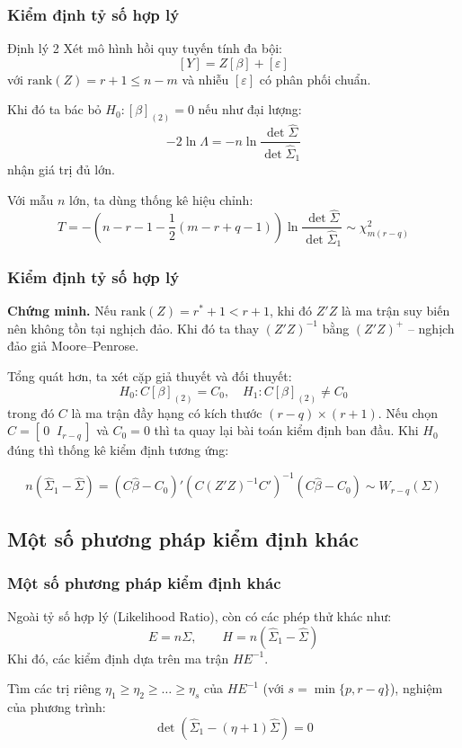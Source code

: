 \begin{frame}
\frametitle{Kiểm định tỷ số hợp lý}
\begin{block}{Định lý 2}
Xét mô hình hồi quy tuyến tính đa bội:
\[
[Y] = Z[\beta] + [\varepsilon]
\]
với $\mathrm{rank}(Z) = r + 1 \le n - m$ và nhiễu $[\varepsilon]$ có phân phối chuẩn.

Khi đó ta bác bỏ $H_0: [\beta]_{(2)} = 0$ nếu như đại lượng:
\[
-2\ln\Lambda = -n\ln\frac{\det \widehat{\Sigma}}{\det \widehat{\Sigma}_1}
\]
nhận giá trị đủ lớn.

Với mẫu $n$ lớn, ta dùng thống kê hiệu chỉnh:
\[
T = -\left(n - r - 1 - \frac{1}{2}(m - r + q - 1)\right)
\ln\frac{\det \widehat{\Sigma}}{\det \widehat{\Sigma}_1}
\sim \chi^2_{m(r-q)}
\]
\end{block}
\end{frame}

\begin{frame}
\frametitle{Kiểm định tỷ số hợp lý}
\textbf{Chứng minh. }Nếu $\mathrm{rank}(Z) = r^* + 1 < r + 1$, khi đó $Z'Z$ là ma trận suy biến nên không tồn tại nghịch đảo. Khi đó ta thay $(Z'Z)^{-1}$ bằng $(Z'Z)^+$ –  
nghịch đảo giả Moore–Penrose.

Tổng quát hơn, ta xét cặp giả thuyết và đối thuyết:
\[
H_0 : C[\beta]_{(2)} = C_0, 
\quad 
H_1 : C[\beta]_{(2)} \neq C_0
\]
trong đó $C$ là ma trận đầy hạng có kích thước $(r - q) \times (r + 1)$.
Nếu chọn $C = [\,0 \;\; I_{r - q}\,]$ và $C_0 = 0$ thì ta quay lại bài toán kiểm định ban đầu.
Khi $H_0$ đúng thì thống kê kiểm định tương ứng:

\[
n(\widehat{\Sigma}_1 - \widehat{\Sigma})
= (C\widehat{\beta} - C_0)'(C(Z'Z)^{-1}C')^{-1}(C\widehat{\beta} - C_0)
\sim W_{r - q}(\Sigma)
\]
\end{frame}

\subsection{Một số phương pháp kiểm định khác}
\begin{frame}
\frametitle{Một số phương pháp kiểm định khác}
Ngoài tỷ số hợp lý (Likelihood Ratio), còn có các phép thử khác như:
\[
E = n\Sigma, \qquad
H = n(\widehat{\Sigma}_1 - \widehat{\Sigma})
\]
Khi đó, các kiểm định dựa trên ma trận $HE^{-1}$.

Tìm các trị riêng $\eta_1 \ge \eta_2 \ge \dots \ge \eta_s$ của $HE^{-1}$  
(với $s = \min\{p, r - q\}$), nghiệm của phương trình:
\[
\det(\widehat{\Sigma}_1 - (\eta + 1)\widehat{\Sigma}) = 0
\]
\end{frame}

